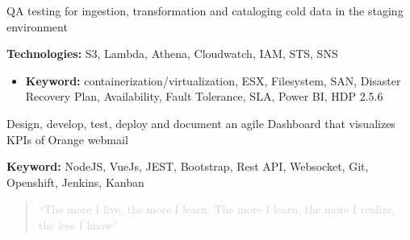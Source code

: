 \documentclass[10pt,a4paper,ragged2e]{altacv}
\begin{document}
\begin{paracol}{2}
\divider
{}
\item QA testing for ingestion, transformation and cataloging cold data in the staging environment  
\item \textbf{Technologies:} S3, Lambda, Athena, Cloudwatch, IAM, STS, SNS
\medskip
\newpage

\begin{itemize}
\item \textbf{Keyword:} containerization/virtualization, ESX, Filesystem, SAN, Disaster Recovery Plan, Availability, Fault Tolerance, SLA, Power BI, HDP 2.5.6
\medskip
\end{itemize}

\divider

\item Design, develop, test, deploy and document an agile Dashboard that visualizes KPIs of Orange webmail
\item \textbf{Keyword:} NodeJS, VueJs, JEST, Bootstrap, Rest API, Websocket, Git, Openshift, Jenkins, Kanban
\medskip






\switchcolumn



\begin{quote}
\textcolor{LightGrey}{``The more I live, the more I learn. The more I learn, the more I realize, the less I know''}
\end{quote}




\end{paracol}
\end{document}
